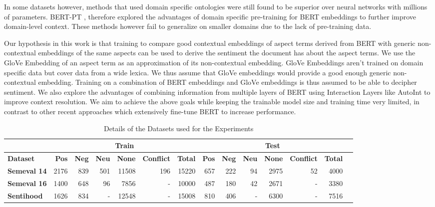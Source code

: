 \documentclass[11pt,a4paper]{article}
\begin{document}
In some datasets however, methods that used domain specific ontologies were still found to be superior over neural networks with millions of parameters. BERT-PT \cite{xu2019bert}, therefore explored the advantages of domain specific pre-training for BERT embeddings to further improve domain-level context. These methods however fail to generalize on smaller domains due to the lack of pre-training data.

Our hypothesis in this work is that training to compare good contextual embeddings of aspect terms derived from BERT with generic non-contextual embeddings of the same aspects can be used to derive the sentiment the document has about the aspect terms. We use the GloVe Embedding \cite{pennington2014glove} of an aspect term as an approximation of its non-contextual embedding. GloVe Embeddings aren’t trained on domain specific data but cover data from a wide lexica. We thus assume that GloVe embeddings would provide a good enough generic non-contextual embedding. Training on a combination of BERT embeddings and GloVe embeddings is thus assumed to be able to decipher sentiment. We also explore the advantages of combining information from multiple layers of BERT using Interaction Layers like AutoInt \cite{Song_2019} to improve context resolution. We aim to achieve the above goals while keeping the trainable model size and training time very limited, in contrast to other recent approaches which extensively fine-tune BERT to increase performance.  
\begin{table*}[!htp]
\centering
\setlength\tabcolsep{3pt} \begin{tabular}{|l|r|r|r|r|r|r|r|r|r|r|r|r|r|}\toprule
&\multicolumn{6}{c|}{\textbf{Train}} &\multicolumn{6}{c|}{\textbf{Test}} \\\midrule
\textbf{Dataset} & \textbf{Pos} & \textbf{Neg} &\textbf{Neu} &\textbf{None} & \textbf{Conflict} &\textbf{Total} &\textbf{Pos} &\textbf{Neg} &\textbf{Neu} &\textbf{None} &\textbf{Conflict} &\textbf{Total} \\
\hline
\textbf{Semeval 14} &2176 &839 &501 &11508 &196 &15220 &657 &222 &94 &2975 &52 &4000 \\
\textbf{Semeval 16} &1400 &648 &96 &7856 &- &10000 &487 &180 &42 &2671 &- &3380 \\
\textbf{Sentihood} &1626 &834 &- &12548 &- &15008 &810 &406 &- &6300 &- &7516 \\
\bottomrule
\end{tabular}
\caption{Details of the Datasets used for the Experiments}
\end{table*}
\end{document}
